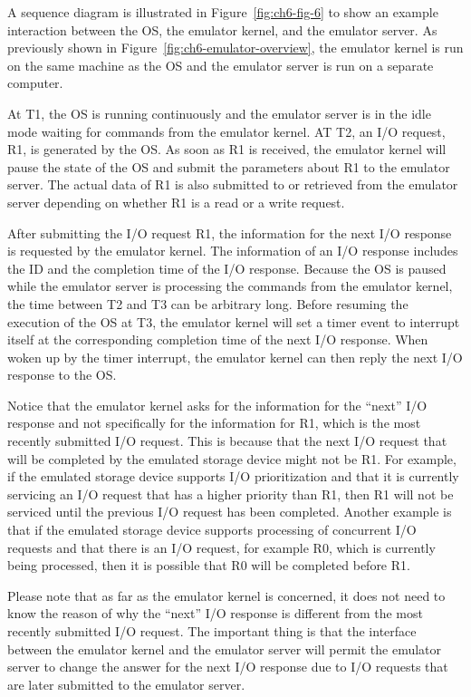 A sequence diagram is illustrated in Figure~\ref{fig:ch6-fig-6} to show an example interaction between the OS, the emulator kernel, and the emulator server. As previously shown in Figure~\ref{fig:ch6-emulator-overview}, the emulator kernel is run on the same machine as the OS and the emulator server is run on a separate computer.

At T1, the OS is running continuously and the emulator server is in the idle mode waiting for commands from the emulator kernel. AT T2, an I/O request, R1, is generated by the OS. As soon as R1 is received, the emulator kernel will pause the state of the OS and submit the parameters about R1 to the emulator server. The actual data of R1 is also submitted to or retrieved from the emulator server depending on whether R1 is a read or a write request.

After submitting the I/O request R1, the information for the next I/O response is requested by the emulator kernel. The information of an I/O response includes the ID and the completion time of the I/O response. Because the OS is paused while the emulator server is processing the commands from the emulator kernel, the time between T2 and T3 can be arbitrary long. Before resuming the execution of the OS at T3, the emulator kernel will set a timer event to interrupt itself at the corresponding completion time of the next I/O response. When woken up by the timer interrupt, the emulator kernel can then reply the next I/O response to the OS.

Notice that the emulator kernel asks for the information for the ``next'' I/O response and not specifically for the information for R1, which is the most recently submitted I/O request. This is because that the next I/O request that will be completed by the emulated storage device might not be R1. For example, if the emulated storage device supports I/O prioritization and that it is currently servicing an I/O request that has a higher priority than R1, then R1 will not be serviced until the previous I/O request has been completed. Another example is that if the emulated storage device supports processing of concurrent I/O requests and that there is an I/O request, for example R0, which is currently being processed, then it is possible that R0 will be completed before R1.

Please note that as far as the emulator kernel is concerned, it does not need to know the reason of why the ``next'' I/O response is different from the most recently submitted I/O request. The important thing is that the interface between the emulator kernel and the emulator server will permit the emulator server to change the answer for the next I/O response due to I/O requests that are later submitted to the emulator server.

